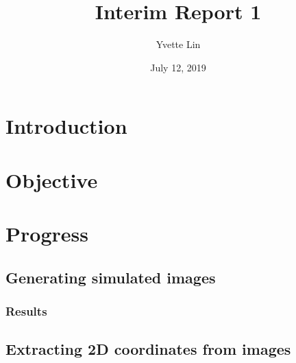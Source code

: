 \documentclass[11pt]{article}
\title{Interim Report 1}
\author{Yvette Lin}
\date{July 12, 2019}
\begin{document}
\maketitle

\section*{Introduction}

\lipsum[3]


\section{Objective}

\lipsum[3]

\section{Progress}

\lipsum[3]

\subsection{Generating simulated images}

\subsubsection{Results}

\lipsum[3]

\subsection{Extracting 2D coordinates from images}

\lipsum[3]
\end{document}
